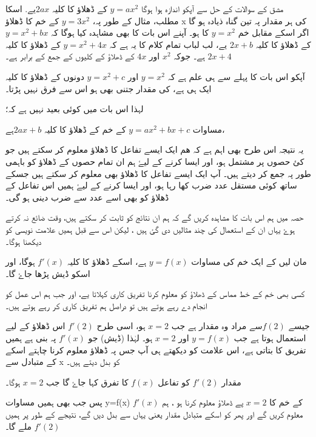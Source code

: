 مشق   کے سوالات کے حل سے آپکو اندازہ ہوا ہوگا \( y=ax^{2}\) کے ڈھلاؤ کا کلیہ \(  2ax   \)یے. اسکا مطلب، مثال کے طور پہ،        \(y=3x^{2}\)    کے خم کا ڈھلاؤ   x کی ہر مقدار پہ تین گناہ ذیادہ ہو گا اگر اسکے مقابل خم \(y=x^{2}\) کا ہو۔ آپنے اس بات کا بھی مشاہدہ کیا ہوگا کہ \(y=x^{2}+bx\)     کے ڈھلاؤ کا کلیہ     \(2x +b\)  یے، لب لباب تمام کلام کا یہ ہے کہ  \(y=x^{2} +4x\)  کے  ڈھلاؤ کا کلیہ   \( 2x+4\)  ہے۔ جوکہ \(x^{2}\) اور \( 4x\) کے ڈھلاؤ کے کلیوں کے جمع کے برابر ہے۔


آپکو اس بات کا پہلے سے ہی علم ہے کہ    \(y=x^{2}\)   اور  \( y=x^{2}+c\)   دونوں کے ڈھلاؤ کا کلیہ ایک ہی ہے،    کی مقدار جتنی بھی ہو اس سے فرق نہیں پڑتا۔

لہذا اس بات میں کوئی بعید نہیں ہے کہ؛

مساوات  \( y=ax^{2}+bx+c\)   کے خم کے  ڈھلاؤ کا کلیہ       \(  2ax +b      \)ہے،


یہ نتیجہ اس طرح بھی اہم ہے کہ ھم ایک ایسے تفاعل کا ڈھلاؤ معلوم کر سکتے ہیں جو کئ حصوں پر مشتمل ہو، اور ایسا کرنے کے لیۓ ہم ان تمام حصوں کے ڈھلاؤ کو باہمی طور پہ جمع کر دیتے ہیں۔
آپ ایک ایسے تفاعل کا ڈھلاؤ بھی  معلوم کر سکتے ہیں جسکے ساتھ کوئی مستقل عدد ضرب کھا رہا ہو، اور ایسا کرنے کے لیۓ ہمیں اس تفاعل کے ڈھلاؤ کو بھی اسے عدد سے ضرب دینی ہو گی۔

حصہ   میں ہم اس بات کا مشاہدہ کریں گے کہ ہم ان نتائج کو ثابت کر سکتے ہیں، وقت ضائع نہ کرتے ہوۓ یہاں ان کے استعمال کی چند مثالیں دی گئ ہیں ، لیکن اس سے قبل ہمیں علامت نویسی کو دیکھنا ہوگا۔


مان لیں کے ایک خم کی مساوات \(y=f(x) \)  ہے، اسکے ڈھلاؤ کا کلیہ \( f\prime (x)\) ہوگا، اور اسکو ڈیش   پڑھا جاۓ گا۔

کسی بھی خم کے خط مماس کے ڈھلاؤ کو معلوم کرنا تفریق کاری کہلاتا یے، اور جب ہم اس عمل کو انجام دے رہے ہوتے ہیں تو دراصل ہم تفریق کاری کر رہے ہوتے ہیں۔


جیسے \(  f(2)     \)سے مراد وہ مقدار ہے جب \( x=2\) ہو، اسی طرح  \( f\prime (2)\) اس ڈھلاؤ کے لیے استعمال ہوتا ہے جب \( y=f(x)\) اور \(x=2\) ہو۔ لہٰذا (ڈیش) جو \( f \prime (x)\) پہ بنی ہے ہمیں تفریق کا بتاتی ہے، اس علامت کو دیکھتے ہی آپ جس  پہ ڈھلاؤ معلوم کرنا چاہتے اسکے  کے متبادل سے x کو بدل دیتے ہیں۔

مقدار \( f\prime (2)\) کو تفاعل \( f(x)\) کا تفرق کہا جاۓ گا جب \(x=2\) ہوگا۔

  
پس جب بھی ہمیں مساوات   y=f(x) کے خم کا   \(x=2\) پے ڈھلاؤ  معلوم کرنا ہو ، ہم \(f\prime (x)\) معلوم کریں گے اور پھر کو اسکے متبادل مقدار یعنی یہاں  سے بدل دیں گے، نتیجے کے طور پر ہمیں \( f\prime (2)\) ملے گا۔


